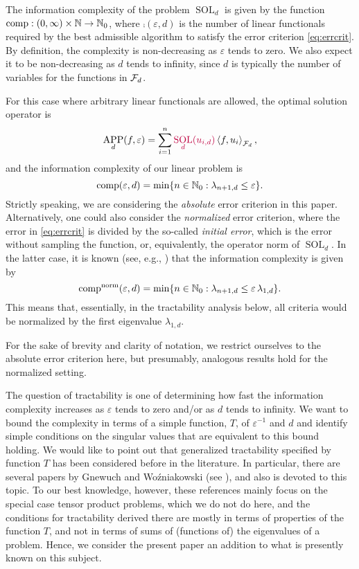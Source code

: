 \documentclass[sort&compress]{elsarticle}
\DeclareMathOperator{\SOL}{SOL}
\DeclareMathOperator{\APP}{APP}
\newcommand{\peter}[1]{\begingroup\color{purple}#1\endgroup}
\begin{document}
The information complexity of the problem $\SOL_d$ is given by the function $\operatorname{comp}:(0,\infty) \times \mathbb{N} \to \mathbb{N}_{0}$, where $\comp(\varepsilon,d)$ is the number of linear functionals required by the best \peter{admissible} algorithm to satisfy the error criterion \eqref{eq:errcrit}.
By definition, the complexity is non-decreasing  as $\varepsilon$ tends to zero.  We also expect it to be non-decreasing as $d$ tends to infinity, since $d$ is typically the number of variables for the functions in $\mathcal{F}_d$.

For this case where arbitrary linear functionals are allowed, the optimal solution operator is
\[
\APP_d(f,\varepsilon) = \sum_{i=1}^n \peter{\SOL_d(u_{i,d})} \ip[\cf_d]{f}{u_i},
\]
and the information complexity of our linear problem is
\begin{equation}\label{eq:comp_def}
\operatorname{comp}(\varepsilon, d) = \min \{n \in \mathbb{N}_{0} : \lambda_{n+1, d} \le \varepsilon\}.
\end{equation}
\peter{
Strictly speaking, we are considering the \textit{absolute} error criterion in this paper. 
Alternatively, one could also consider the \textit{normalized} error criterion, where the error in \eqref{eq:errcrit} is divided by the so-called \textit{initial error}, which is the error without sampling the function, or, equivalently, the operator norm of $\SOL_d$. In the latter case, it is known (see, e.g., \cite{NovWoz08a}) that the information complexity is given by 
\[
\operatorname{comp}^{\rm norm}(\varepsilon, d) = \min \{n \in \mathbb{N}_{0} : \lambda_{n+1, d} \le \varepsilon\, \lambda_{1, d}\}.
\]
This means that, essentially, in the tractability analysis below, all criteria would be normalized by the first eigenvalue $\lambda_{1,d}$. 

For the sake of brevity and clarity of notation, we restrict ourselves to the absolute error criterion here, but presumably, analogous results hold for the normalized setting. 
}

The question of tractability is one of determining how fast the \peter{information} complexity increases as $\varepsilon$ tends to zero and/or as $d$ tends to infinity.  We want to bound the complexity in terms of a simple function, $T$, of $\varepsilon^{-1}$ and $d$ and identify simple conditions on the singular values that are equivalent to this bound holding. \peter{We would like to point out that generalized tractability specified by function $T$ has been considered before in the literature. In particular, there are several papers by Gnewuch and Wo\'{z}niakowski (see \cite{GW06,GW08,GW09,GneWoz11a} ), and also \cite[Chapter 8]{NovWoz08a} is devoted to this topic. To our best knowledge, however, these references mainly focus on the special case tensor product problems, which we do not do here, and the conditions for tractability derived there are mostly in terms of properties of the function $T$, and not in terms of sums of (functions of) the eigenvalues of a problem. Hence, we consider the present paper an addition to what is presently known on this subject.}
\end{document}
